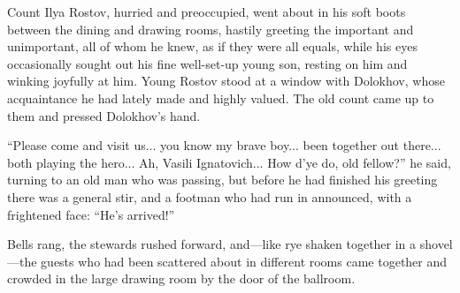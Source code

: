Count Ilya Rostov, hurried and preoccupied, went about in his
soft boots between the dining and drawing rooms, hastily greeting
the important and unimportant, all of whom he knew, as if they
were all equals, while his eyes occasionally sought out his fine
well-set-up young son, resting on him and winking joyfully at
him. Young Rostov stood at a window with Dolokhov, whose
acquaintance he had lately made and highly valued. The old count
came up to them and pressed Dolokhov's hand.

``Please come and visit us... you know my brave boy... been
together out there... both playing the hero... Ah, Vasili
Ignatovich... How d'ye do, old fellow?'' he said, turning to an
old man who was passing, but before he had finished his greeting
there was a general stir, and a footman who had run in announced,
with a frightened face: ``He's arrived!''

Bells rang, the stewards rushed forward, and---like rye shaken
together in a shovel---the guests who had been scattered about in
different rooms came together and crowded in the large drawing
room by the door of the ballroom.

